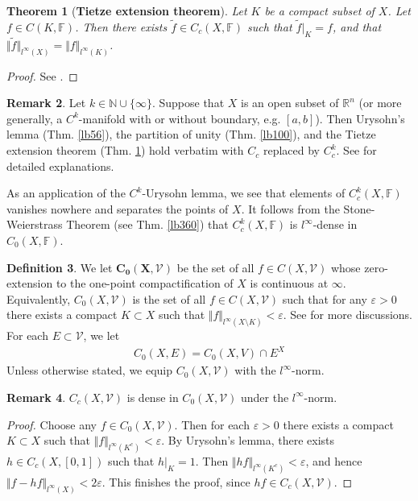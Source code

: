 \documentclass[12pt,b5paper,notitlepage]{article}
\theoremstyle{definition}
\newtheorem{df}{Definition}[subsection]
\newtheorem{rem}[df]{Remark}
\theoremstyle{plain}
\newtheorem{thm}[df]{Theorem}
\newcommand{\mc}{\mathcal}
\newcommand{\wtd}{\widetilde}
\newcommand{\Nbb}{\mathbb N}
\newcommand{\Rbb}{\mathbb R}
\newcommand{\Fbb}{\mathbb F}
\newcommand{\eps}{\varepsilon}
\newcommand{\MV}{\mathcal V}
\newcommand{\hqed}{\hfill\qedsymbol}
\numberwithin{equation}{section}
\begin{document}
\begin{thm}[\textbf{Tietze extension theorem}]\label{lb83}
Let $K$ be a compact subset of $X$. Let $f\in C(K,\Fbb)$. Then there exists $\wtd f\in C_c(X,\Fbb)$ such that $\wtd f|_K=f$, and that $\Vert\wtd f\Vert_{l^\infty(X)}=\Vert f\Vert_{l^\infty(K)}$.
\end{thm}

\begin{proof}
See \cite[Sec. 15.4]{Gui-A}.
\end{proof}

\begin{rem}\label{lb359}
Let $k\in\Nbb\cup\{\infty\}$. Suppose that $X$ is an open subset of $\Rbb^n$ (or more generally, a $C^k$-manifold with or without boundary, e.g. $[a,b]$). Then Urysohn's lemma (Thm. \ref{lb56}), the partition of unity (Thm. \ref{lb100}), and the Tietze extension theorem (Thm. \ref{lb83}) hold verbatim with $C_c$ replaced by $C_c^k$. See \cite[Sec. 30.6]{Gui-A} for detailed explanations.

As an application of the $C^k$-Urysohn lemma, we see that elements of $C^k_c(X,\Fbb)$ vanishes nowhere and separates the points of $X$. It follows from the Stone-Weierstrass Theorem (see Thm. \ref{lb360}) that $C_c^k(X,\Fbb)$ is $l^\infty$-dense in $C_0(X,\Fbb)$.   \hqed
\end{rem}




\begin{df}
We let \index{C0@$C_0(X,\mc V),C_0(X,E)$} $\pmb{C_0(X,\mc V)}$ be the set of all $f\in C(X,\mc V)$ whose zero-extension to the one-point compactification of $X$ is continuous at $\infty$. Equivalently, $C_0(X,\mc V)$ is the set of all $f\in C(X,\mc V)$ such that for any $\eps>0$ there exists a compact $K\subset X$ such that $\Vert f\Vert_{l^\infty(X\setminus K)}<\eps$. See \cite[Subsec. 15.8.1]{Gui-A} for more discussions. For each $E\subset\mc V$, we let
\begin{align*}
C_0(X,E)=C_0(X,V)\cap E^X
\end{align*}
Unless otherwise stated, we equip $C_0(X,\MV)$ with the $l^\infty$-norm.
\end{df}


\begin{rem}\label{lb357}
$C_c(X,\mc V)$ is dense in $C_0(X,\mc V)$ under the $l^\infty$-norm.
\end{rem}

\begin{proof}
Choose any $f\in C_0(X,\mc V)$. Then for each $\eps>0$ there exists a compact $K\subset X$ such that $\Vert f\Vert_{l^\infty(K^c)}<\eps$. By Urysohn's lemma, there exists $h\in C_c(X,[0,1])$ such that $h|_K=1$. Then $\Vert hf\Vert_{l^\infty(K^c)}<\eps$, and hence $\Vert f-hf\Vert_{l^\infty(X)}<2\eps$. This finishes the proof, since $hf\in C_c(X,\mc V)$.
\end{proof}
\end{document}
